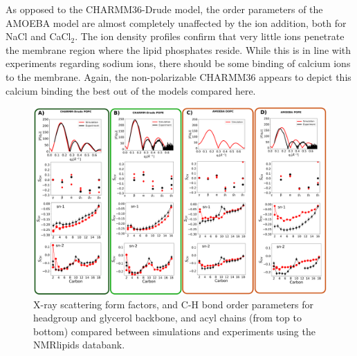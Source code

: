 \documentclass[journal=jacsat,manuscript=article,layout=singlecolumn]{achemso}
\begin{document}
As opposed to the CHARMM36-Drude model, the order parameters of the AMOEBA model are almost completely unaffected by the ion addition, both for NaCl and CaCl$_{2}$. The ion density profiles confirm that very little ions penetrate the membrane region where the lipid phosphates reside. While this is in line with experiments regarding sodium ions, there should be some binding of calcium ions to the membrane. Again, the non-polarizable CHARMM36 appears to depict this calcium binding the best out of the models compared here.





\begin{figure}[!hbt]
    \centering
    \includegraphics[width=\textwidth]{Figures/quality.pdf}
    \caption{X-ray scattering form factors, and C-H bond order parameters for headgroup and glycerol backbone, and acyl chains (from top to bottom) compared between simulations and experiments using the NMRlipids databank.}
    \label{fig:order_parameters}

\end{figure}
\end{document}
